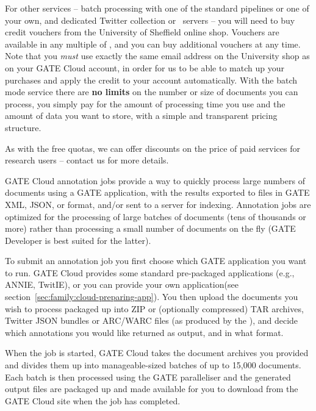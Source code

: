 For other services -- batch processing with one of the standard pipelines or
one of your own, and dedicated Twitter collection or \Mimir\ servers -- you
will need to buy credit vouchers from the
{University of Sheffield online shop}.  Vouchers are available in any multiple
of , and you can buy additional vouchers at any time.  Note that
you \emph{must} use exactly the same email address on the University shop as on
your GATE Cloud account, in order for us to be able to match up your purchases
and apply the credit to your account automatically.  With the batch mode service
there are \textbf{no limits} on the number or size of documents you can process,
you simply pay for the amount of processing time you use and the amount of data
you want to store, with a simple and transparent pricing structure.

As with the free quotas, we can offer discounts on the price of paid services
for research users -- contact us for more details.



GATE Cloud annotation jobs provide a way to quickly process large numbers of
documents using a GATE application, with the results exported to files in GATE
XML, JSON, or  format, and/or sent to a
 server for indexing.
Annotation jobs are optimized for the processing of large batches of documents
(tens of thousands or more) rather than processing a small number of documents
on the fly (GATE Developer is best suited for the latter).

To submit an annotation job you first choose which GATE application you want to
run.  GATE Cloud provides some standard pre-packaged applications 
(e.g., ANNIE, TwitIE), or you can
provide your own application\ifprintedbook (see
section~\ref{sec:family:cloud-preparing-app})\fi. 
You then upload the documents you wish to process packaged up into ZIP or (optionally
compressed) TAR archives, Twitter JSON bundles or ARC/WARC files (as produced by the
), and decide which
annotations you would like returned as output, and in what format.

When the job is started, GATE Cloud takes the document archives you provided
and divides them up into manageable-sized batches of up to 15,000 documents.
Each batch is then processed using the GATE paralleliser and
the generated output files are packaged up and made available for you to
download from the GATE Cloud site when the job has completed.

